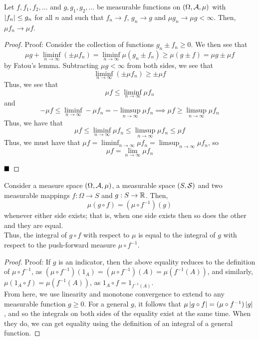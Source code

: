
\begin{theorem}
    Let $f, f_1, f_2, \ldots$ and $g, g_1, g_2, \ldots$ be measurable functions on $(\Omega, \cal{A}, \mu)$ with $\abs{f_n} \leq g_n$ for all $n$ and such that $f_n \to f$, $g_n \to g$ and $\mu g_n \to \mu g < \infty$. Then, $\mu f_n \to \mu f$. 
\end{theorem}
\begin{proof}{Proof:}
    Consider the collection of functions $g_n \pm f_n \geq 0$. We then see that
    \[ \mu g + \liminf_{n \to \infty}\left(\pm \mu f_n \right) = \liminf_{n \to \infty} \mu(g_n \pm f_n) \geq \mu(g \pm f) = \mu g \pm \mu f \]
    by Fatou's lemma. Subtracting $\mu g < \infty$ from both sides, we see that
    \[ \liminf_{n \to \infty}(\pm \mu f_n) \geq \pm \mu f \]
    Thus, we see that
    \[ \mu f \leq \liminf_{n \to \infty} \mu f_n \]
    and
    \[ -\mu f \leq \liminf_{n \to \infty} -\mu f_n = -\limsup_{n \to \infty} \mu f_n \implies \mu f \geq \limsup_{n \to \infty} \mu f_n\]
    Thus, we have that
    \[ \mu f \leq \liminf_{n \to \infty} \mu f_n \leq \limsup_{n \to \infty} \mu f_n \leq \mu f \]
    Thus, we must have that $\mu f = \liminf_{n \to \infty} \mu f_n = \limsup_{n \to \infty} \mu f_n$, so 
    \[ \mu f = \lim_{n \to \infty} \mu f_n \]

    $\qed$
\end{proof}

\begin{lemma}
    Consider a measure space $(\Omega, \cal{A}, \mu)$, a measurable space $(S, \cal{S})$ and two measurable mappings $f : \Omega \to S$ and $g : S \to \R$. Then, 
    \[ \mu(g \circ f) = (\mu \circ f^{-1})(g) \]
    whenever either side exists; that is, when one side exists then so does the other and they are equal.\\

    Thus, the integral of $g \circ f$ with respect to $\mu$ is equal to the integral of $g$ with respect to the push-forward measure $\mu \circ f^{-1}$. 
\end{lemma}
\begin{proof}{Proof:}
    If $g$ is an indicator, then the above equality reduces to the definition of $\mu \circ f^{-1}$, as $(\mu \circ f^{-1})(1_{A}) = (\mu \circ f^{-1})(A) = \mu(f^{-1}(A))$, and similarly, $\mu(1_{A} \circ f) = \mu(f^{-1}(A))$, as $1_{A} \circ f = 1_{f^{-1}(A)}$.\\

    From here, we use linearity and monotone convergence to extend to any measurable function $g \geq 0$. For a general $g$, it follows that $\mu \abs{g \circ f} = (\mu \circ f^{-1})\abs{g}$, and so the integrals on both sides of the equality exist at the same time. When they do, we can get equality using the definition of an integral of a general function.
\end{proof}

